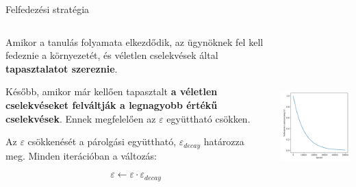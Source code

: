 \documentclass[english, aspectratio=169]{beamer}
\begin{document}
\begin{frame}{Felfedezési stratégia}
\begin{columns}
\begin{column}{.5\textwidth}
Amikor a tanulás folyamata elkezdődik, az ügynöknek fel kell fedeznie a környezetét, és véletlen cselekvések által \textbf{tapasztalatot szereznie}.\par\smallskip
Később, amikor már kellően tapasztalt \textbf{a véletlen cselekvéseket felváltják a legnagyobb értékű cselekvések}. Ennek megfelelően az $\varepsilon$ együttható csökken.\par\smallskip
Az $\varepsilon$ csökkenését a párolgási együttható, $\varepsilon_{decay}$ határozza meg. Minden iterációban a változás:
\begin{block}{}
\vspace{-.2cm}
\[
\varepsilon \leftarrow \varepsilon \cdot \varepsilon_{decay}
\]
\end{block}
\end{column}
\begin{column}{.5\textwidth}
\begin{center}
\includegraphics[width=7cm, height=7cm, keepaspectratio]{images/reinforcement_15.png}
\end{center}
\end{column}
\end{columns}
\end{frame}
\end{document}
